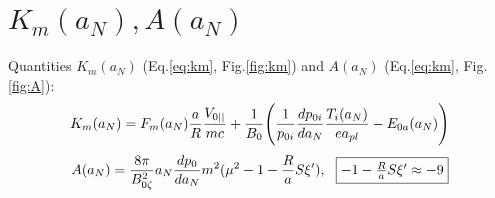 \documentclass[11pt,oneside,a4paper,notitlepage]{article}
\begin{document}
\section{$K_m(a_N), A(a_N)$}
Quantities $K_m(a_N)$ (Eq.\ref{eq:km}, Fig.\ref{fig:km}) and $A(a_N)$ 
(Eq.\ref{eq:km}, Fig.\ref{fig:A}):
\begin{equation}\label{eq:km}
 K_m(a_N)=F_m(a_N)\frac{a}{R}\frac{V_{0||}}{mc}+\frac{1}{B_0} \\
 \Bigg( \frac{1}{p_{0i}} \frac{dp_{0i}}{da_N} \frac{T_i(a_N)}{ea_{pl}}-E_{0a}(a_N) \Bigg)
\end{equation}
\begin{equation}
 A(a_N)=\frac{8\pi}{B_{0\zeta}^2}a_N \frac{dp_0}{da_N}m^2 (\mu^2-1- \\
 \frac{R}{a}S\xi'), ~~\fbox{$-1-\frac{R}{a}S\xi'\approx-9$}
\end{equation}
\end{document}
